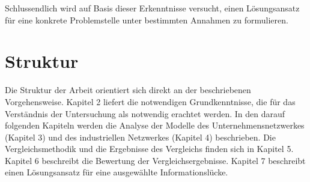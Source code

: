 Schlussendlich wird auf Basis dieser Erkenntnisse versucht, einen Lösungsansatz für eine konkrete Problemstelle unter bestimmten Annahmen zu formulieren.


\section{Struktur}
Die Struktur der Arbeit orientiert sich direkt an der beschriebenen Vorgehensweise. Kapitel 2 liefert die notwendigen Grundkenntnisse, die für das Verständnis der Untersuchung als notwendig erachtet werden. In den darauf folgenden Kapiteln werden die Analyse der Modelle des Unternehmensnetzwerkes (Kapitel 3) und des industriellen Netzwerkes (Kapitel 4) beschrieben. Die Vergleichsmethodik und die Ergebnisse des Vergleichs finden sich in Kapitel 5. Kapitel 6 beschreibt die Bewertung der Vergleichsergebnisse. Kapitel 7 beschreibt einen Lösungsansatz für eine ausgewählte Informationslücke.